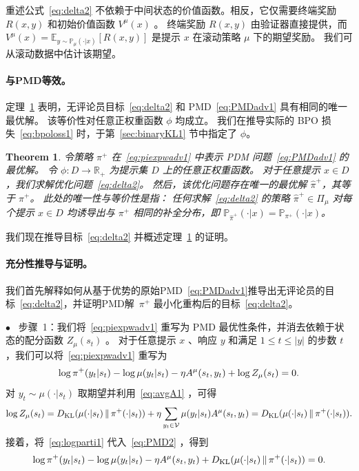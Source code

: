 \documentclass[11pt]{article}
\newtheorem{theorem}{Theorem}%
\theoremstyle{definition}
\def\eql#1#2{\begin{equation}{#1}\begin{split}#2\end{split}\end{equation}}
\def\br#1{\left[ #1 \right ] }
\newcommand \Real{\mathbb{R}}
\def\KL#1#2{D_{\mathrm{KL}}(#1 \,\Vert\, #2)}
\newcommand\Eb{\mathbb{E}}
\newcommand\cmu{\mathbb{P}_{\mu}}
\def\cpx#1{\mathbb{P}_{#1}}
\begin{document}
重述公式~\eqref{eq:delta2} 不依赖于中间状态的价值函数。相反，它仅需要终端奖励 $R(x,y)$ 和初始价值函数 $V^\mu(x)$ 。  
终端奖励 $R(x,y)$ 由验证器直接提供，而  
$
    V^\mu(x) = \Eb_{y\sim\cmu(\cdot|x)}\br{R(x,y)}
$ 
是提示 $x$ 在滚动策略 $\mu$ 下的期望奖励。  
我们可从滚动数据中估计该期望。

\paragraph{与PMD等效。}
定理~\ref{thm:delta2} 表明，无评论员目标~\eqref{eq:delta2} 和 PMD~\eqref{eq:PMDadv1} 具有相同的唯一最优解。  
该等价性对任意正权重函数 $\phi$ 均成立。  
我们在推导实际的 BPO 损失~\eqref{eq:bpoloss1} 时，于第~\ref{sec:binaryKL1} 节中指定了 $\phi$。

\begin{theorem}\label{thm:delta2}
    令策略 $\pi^+$ 在~\eqref{eq:piexpwadv1} 中表示 PDM 问题~\eqref{eq:PMDadv1} 的最优解。  
令 $\phi: D\rightarrow\Real_+$ 为提示集 $D$ 上的任意正权重函数。  
对于任意提示 $x \in D$ ，我们求解优化问题~\eqref{eq:delta2}。  
然后，该优化问题存在唯一的最优解 $\hat{\pi}^+$，其等于 $\pi^+$。  
此处的唯一性与等价性是指：  
任何求解~\eqref{eq:delta2} 的策略 $\hat{\pi}^+\in \Pi_{\mu}$ 对每个提示 $x\in D$ 均诱导出与 $\pi^+$ 相同的补全分布，即 $\cpx{\hat{\pi}^+}(\cdot|x) = \cpx{\pi^+}(\cdot|x)$。          
\end{theorem}

我们现在推导目标~\eqref{eq:delta2} 并概述定理~\ref{thm:delta2} 的证明。 

\paragraph{充分性推导与证明。}
我们首先解释如何从基于优势的原始PMD~\eqref{eq:PMDadv1}推导出无评论员的目标~\eqref{eq:delta2}，并证明PMD解~$\pi^+$ 最小化重构后的目标~\eqref{eq:delta2}。

\vspace{0.2cm}
\noindent$\bullet$ ~步骤~1：我们将~\eqref{eq:piexpwadv1} 重写为 PMD 最优性条件，并消去依赖于状态的配分函数 $Z_{\mu}(s_t)$ 。  
对于任意提示 $x$ 、响应 $y$ 和满足 $1\leq t \leq |y|$ 的步数 $t$ ，我们可以将~\eqref{eq:piexpwadv1} 重写为  
\eql{\label{eq:PMD2}}{
    \log\pi^+(y_t | s_t) - \log\mu(y_t | s_t) - \eta A^{\mu}(s_t, y_t) + \log Z_{\mu}(s_t) = 0.  
} 
对 $y_t \sim \mu(\cdot | s_t)$ 取期望并利用~\eqref{eq:avgA1} ，可得  
\eql{\label{eq:logparti1}}{
    \log Z_{\mu}(s_t) = \KL{\mu(\cdot | s_t)}{\pi^+(\cdot | s_t)} + \eta \sum_{y_t\in \mathcal{V}} \mu(y_t | s_t) A^{\mu}(s_t, y_t) = \KL{\mu(\cdot | s_t)}{\pi^+(\cdot | s_t)}.      
} 
接着，将~\eqref{eq:logparti1} 代入~\eqref{eq:PMD2} ，得到  
\eql{\label{eq:PMDKL1}}{
    \log\pi^+(y_t | s_t) - \log\mu(y_t | s_t) - \eta A^{\mu}(s_t, y_t) + \KL{\mu(\cdot | s_t)}{\pi^+(\cdot | s_t)}= 0.  
}  
\end{document}

